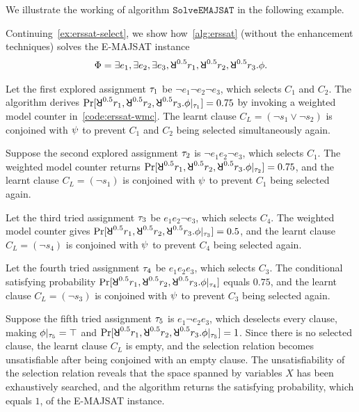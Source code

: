 We illustrate the working of algorithm $\mathtt{SolveEMAJSAT}$ in the following example.
\begin{example}\label{ex:erssat-basic}
    Continuing~\cref{ex:erssat-select},
    we show how~\cref{alg:erssat} (without the enhancement techniques) solves the E-MAJSAT instance
    \begin{align*}
        \Qf=\exists e_1,\exists e_2,\exists e_3,\random{0.5} r_1,\random{0.5} r_2,\random{0.5} r_3.\pf.
    \end{align*}

    Let the first explored assignment $\tau_1$ be $\lnot e_1 \lnot e_2 \lnot e_3$,
    which selects $C_1$ and $C_2$.
    The algorithm derives $\spb{\random{0.5} r_1,\random{0.5} r_2,\random{0.5} r_3.\pcf{\pf}{\as_1}}=0.75$ by invoking a weighted model counter in~\cref{code:erssat-wmc}.
    The learnt clause $C_L=(\lnot s_1 \lor \lnot s_2)$ is conjoined with $\psi$ to prevent $C_1$ and $C_2$ being selected simultaneously again.

    Suppose the second explored assignment $\tau_2$ is $\lnot e_1 e_2 \lnot e_3$,
    which selects $C_1$.
    The weighted model counter returns $\spb{\random{0.5} r_1,\random{0.5} r_2,\random{0.5} r_3.\pcf{\pf}{\as_2}}=0.75$,
    and the learnt clause $C_L=(\lnot s_1)$ is conjoined with $\psi$ to prevent $C_1$ being selected again.

    Let the third tried assignment $\tau_3$ be $e_1 e_2 \lnot e_3$,
    which selects $C_4$.
    The weighted model counter gives $\spb{\random{0.5} r_1,\random{0.5} r_2,\random{0.5} r_3.\pcf{\pf}{\as_3}}=0.5$,
    and the learnt clause $C_L=(\lnot s_4)$ is conjoined with $\psi$ to prevent $C_4$ being selected again.

    Let the fourth tried assignment $\tau_4$ be $e_1 e_2 e_3$,
    which selects $C_3$.
    The conditional satisfying probability $\spb{\random{0.5} r_1,\random{0.5} r_2,\random{0.5} r_3.\pcf{\pf}{\as_4}}$ equals $0.75$,
    and the learnt clause $C_L=(\lnot s_3)$ is conjoined with $\psi$ to prevent $C_3$ being selected again.

    Suppose the fifth tried assignment $\tau_5$ is $e_1 \lnot e_2 e_3$,
    which deselects every clause, making $\phi|_{\tau_5}=\top$ and
    $\spb{\random{0.5} r_1,\random{0.5} r_2,\random{0.5} r_3.\pcf{\pf}{\as_5}}=1$.
    Since there is no selected clause,
    the learnt clause $C_L$ is empty,
    and the selection relation becomes unsatisfiable after being conjoined with an empty clause.
    The unsatisfiability of the selection relation reveals that the space spanned by variables $X$ has been exhaustively searched,
    and the algorithm returns the satisfying probability, which equals $1$, of the E-MAJSAT instance.
\end{example}